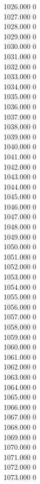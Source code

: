 { 1026.000	0 \\
 1027.000	0 \\
 1028.000	0 \\
 1029.000	0 \\
 1030.000	0 \\
 1031.000	0 \\
 1032.000	0 \\
 1033.000	0 \\
 1034.000	0 \\
 1035.000	0 \\
 1036.000	0 \\
 1037.000	0 \\
 1038.000	0 \\
 1039.000	0 \\
 1040.000	0 \\
 1041.000	0 \\
 1042.000	0 \\
 1043.000	0 \\
 1044.000	0 \\
 1045.000	0 \\
 1046.000	0 \\
 1047.000	0 \\
 1048.000	0 \\
 1049.000	0 \\
 1050.000	0 \\
 1051.000	0 \\
 1052.000	0 \\
 1053.000	0 \\
 1054.000	0 \\
 1055.000	0 \\
 1056.000	0 \\
 1057.000	0 \\
 1058.000	0 \\
 1059.000	0 \\
 1060.000	0 \\
 1061.000	0 \\
 1062.000	0 \\
 1063.000	0 \\
 1064.000	0 \\
 1065.000	0 \\
 1066.000	0 \\
 1067.000	0 \\
 1068.000	0 \\
 1069.000	0 \\
 1070.000	0 \\
 1071.000	0 \\
 1072.000	0 \\
 1073.000	0 \\
}
